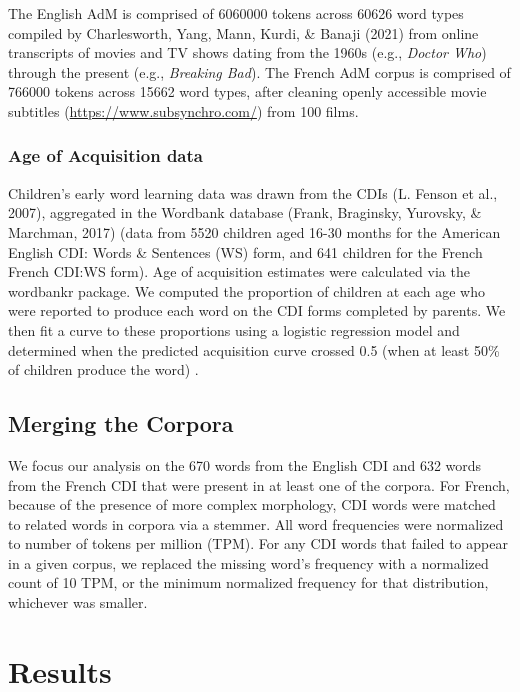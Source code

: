 \documentclass[10pt, letterpaper]{article}
\begin{document}
The English AdM is comprised of 6060000 tokens across 60626 word types
compiled by Charlesworth, Yang, Mann, Kurdi, \& Banaji (2021) from
online transcripts of movies and TV shows dating from the 1960s (e.g.,
\emph{Doctor Who}) through the present (e.g., \emph{Breaking Bad}). The
French AdM corpus is comprised of 766000 tokens across 15662 word types,
after cleaning openly accessible movie subtitles
(\url{https://www.subsynchro.com/}) from 100 films.

\hypertarget{age-of-acquisition-data}{%
\subsubsection{Age of Acquisition data}\label{age-of-acquisition-data}}

Children's early word learning data was drawn from the CDIs (L. Fenson
et al., 2007), aggregated in the Wordbank database (Frank, Braginsky,
Yurovsky, \& Marchman, 2017) (data from 5520 children aged 16-30 months
for the American English CDI: Words \& Sentences (WS) form, and 641
children for the French French CDI:WS form). Age of acquisition
estimates were calculated via the wordbankr package. We computed the
proportion of children at each age who were reported to produce each
word on the CDI forms completed by parents. We then fit a curve to these
proportions using a logistic regression model and determined when the
predicted acquisition curve crossed 0.5 (when at least 50\% of children
produce the word) .

\hypertarget{merging-the-corpora}{%
\subsection{Merging the Corpora}\label{merging-the-corpora}}

We focus our analysis on the 670 words from the English CDI and 632
words from the French CDI that were present in at least one of the
corpora. For French, because of the presence of more complex morphology,
CDI words were matched to related words in corpora via a stemmer. All
word frequencies were normalized to number of tokens per million (TPM).
For any CDI words that failed to appear in a given corpus, we replaced
the missing word's frequency with a normalized count of 10 TPM, or the
minimum normalized frequency for that distribution, whichever was
smaller.

\hypertarget{results}{%
\section{Results}\label{results}}
\end{document}
